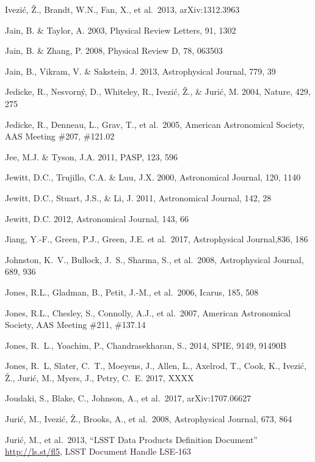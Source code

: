 \documentclass[twocolumn]{aastex61}
\begin{document}
\begin{thebibliography}{}
\bibitem[()]{} Ivezi\'c, \v Z., Brandt, W.N., Fan, X., et al.~2013, arXiv:1312.3963

\bibitem[()]{} Jain, B. \& Taylor, A. 2003, Physical Review Letters, 91, 1302

\bibitem[()]{} Jain, B. \& Zhang, P. 2008, Physical Review D, 78, 063503

\bibitem[()]{} Jain, B., Vikram, V. \& Sakstein, J. 2013, Astrophysical Journal, 779, 39

\bibitem[()]{} Jedicke, R., Nesvorn{\'y}, D., Whiteley, R., Ivezi{\'c}, {\v Z}., \& Juri{\'c}, M. 2004,
             Nature, 429, 275

\bibitem[()]{} Jedicke, R., Denneau, L., Grav, T., et al.~2005, American Astronomical Society, AAS
             Meeting \#207, \#121.02

\bibitem[()]{} Jee, M.J. \& Tyson, J.A. 2011, PASP, 123, 596

\bibitem[()]{} Jewitt, D.C., Trujillo, C.A. \& Luu, J.X. 2000, Astronomical Journal, 120, 1140

\bibitem[()]{} Jewitt, D.C., Stuart, J.S., \& Li, J. 2011, Astronomical Journal, 142, 28

\bibitem[()]{} Jewitt, D.C. 2012, Astronomical Journal, 143, 66

\bibitem[()]{} Jiang, Y.-F., Green, P.J., Green, J.E. et al.~2017, Astrophysical Journal,836, 186

\bibitem[()]{} Johnston, K.~V., Bullock, J.~S., Sharma, S., et al.~2008, Astrophysical Journal, 689, 936

\bibitem[()]{} Jones, R.L., Gladman, B., Petit, J.-M., et al.~2006, Icarus, 185, 508

\bibitem[()]{} Jones, R.L., Chesley, S., Connolly, A.J., et al.~2007, American Astronomical Society, AAS
             Meeting \#211, \#137.14

\bibitem[()]{}  Jones, R.~L., Yoachim, P., Chandrasekharan, S., 2014, SPIE, 9149, 91490B

\bibitem[()]{} Jones, R.~L, Slater, C.~T., Moeyens, J., Allen, L., Axelrod, T., Cook, K., Ivezi\'{c}, \v{Z}.,  Juri\'{c}, M., Myers, J., Petry, C.~E. 2017, XXXX

\bibitem[()]{} Joudaki, S., Blake, C., Johnson, A., et al.~2017, arXiv:1707.06627

\bibitem[()]{} Juri\'{c}, M., Ivezi\'c, \v Z., Brooks, A., et al.~2008, Astrophysical Journal, 673, 864

\bibitem[()]{} Juri\'{c}, M., et al.~2013, ``LSST Data Products Definition Document'' \url{http://ls.st/fl5}, LSST Document Handle LSE-163


\end{thebibliography}
\end{document}
